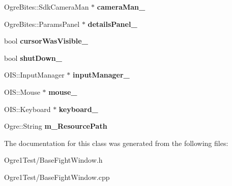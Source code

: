 \begin{DoxyCompactItemize}
\item 
Ogre\+Bites\+::\+Sdk\+Camera\+Man $\ast$ {\bfseries camera\+Man\+\_\+}\hypertarget{class_base_fight_window_acd5e5b3d9e939e5906486dbd8bdbdfc5}{}\label{class_base_fight_window_acd5e5b3d9e939e5906486dbd8bdbdfc5}

\item 
Ogre\+Bites\+::\+Params\+Panel $\ast$ {\bfseries details\+Panel\+\_\+}\hypertarget{class_base_fight_window_aababebe0c8f7fcbc37e59f691f10d851}{}\label{class_base_fight_window_aababebe0c8f7fcbc37e59f691f10d851}

\item 
bool {\bfseries cursor\+Was\+Visible\+\_\+}\hypertarget{class_base_fight_window_a45fc73de6f024e3f0f2d974550346351}{}\label{class_base_fight_window_a45fc73de6f024e3f0f2d974550346351}

\item 
bool {\bfseries shut\+Down\+\_\+}\hypertarget{class_base_fight_window_a9b65f7bb08133d97a2971f32407b66d4}{}\label{class_base_fight_window_a9b65f7bb08133d97a2971f32407b66d4}

\item 
O\+I\+S\+::\+Input\+Manager $\ast$ {\bfseries input\+Manager\+\_\+}\hypertarget{class_base_fight_window_ab51091efcba8fde4be5376fb47aa232e}{}\label{class_base_fight_window_ab51091efcba8fde4be5376fb47aa232e}

\item 
O\+I\+S\+::\+Mouse $\ast$ {\bfseries mouse\+\_\+}\hypertarget{class_base_fight_window_a0a032604d22b591d7d21b2454bb4beec}{}\label{class_base_fight_window_a0a032604d22b591d7d21b2454bb4beec}

\item 
O\+I\+S\+::\+Keyboard $\ast$ {\bfseries keyboard\+\_\+}\hypertarget{class_base_fight_window_ae76524e4a16bcaf24ff167e3f140b554}{}\label{class_base_fight_window_ae76524e4a16bcaf24ff167e3f140b554}

\item 
Ogre\+::\+String {\bfseries m\+\_\+\+Resource\+Path}\hypertarget{class_base_fight_window_a8a17ae4bf060527b4e82f520da48ba9e}{}\label{class_base_fight_window_a8a17ae4bf060527b4e82f520da48ba9e}

\end{DoxyCompactItemize}


The documentation for this class was generated from the following files\+:\begin{DoxyCompactItemize}
\item 
Ogre1\+Test/Base\+Fight\+Window.\+h\item 
Ogre1\+Test/Base\+Fight\+Window.\+cpp\end{DoxyCompactItemize}
